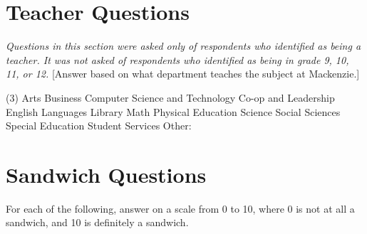 \section{Teacher Questions}
	\textit{Questions in this section were asked only of respondents who identified as being a teacher.
	It was not asked of respondents who identified as being in grade 9, 10, 11, or 12.}
	[Answer based on what department teaches the subject at Mackenzie.]
	\begin{multiplechoice}(3)
		\choice Arts
		\choice Business
		\choice Computer Science and Technology
		\choice Co-op and Leadership
		\choice English
		\choice Languages
		\choice Library
		\choice Math
		\choice Physical Education
		\choice Science
		\choice Social Sciences
		\choice Special Education
		\choice Student Services
		\choice Other: \blank
	\end{multiplechoice}

\section{Sandwich Questions}
	For each of the following, answer on a scale from 0 to 10, where 0 is not at all a sandwich, and 10 is definitely a sandwich.














